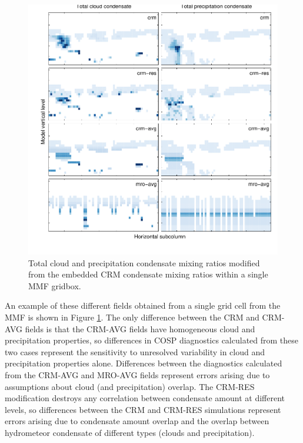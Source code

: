 \documentclass[letter]{article}
\begin{document}
\begin{figure}
\centering
\includegraphics{test_subgrid.pdf}
\caption{Total cloud and precipitation condensate mixing ratios modified from the embedded CRM condensate mixing ratios within a single MMF gridbox.}
\label{subgrid_fields}
\end{figure}

An example of these different fields obtained from a single grid cell from the MMF is shown in Figure \ref{subgrid_fields}. The only difference between the CRM and CRM-AVG fields is that the CRM-AVG fields have homogeneous cloud and precipitation properties, so differences in COSP diagnostics calculated from these two cases represent the sensitivity to unresolved variability in cloud and precipitation properties alone. Differences between the diagnostics calculated from the CRM-AVG and MRO-AVG fields represent errors arising due to assumptions about cloud (and precipitation) overlap. The CRM-RES modification destroys any correlation between condensate amount at different levels, so differences between the CRM and CRM-RES simulations represent errors arising due to condensate amount overlap and the overlap between hydrometeor condensate of different types (clouds and precipitation).
\end{document}
